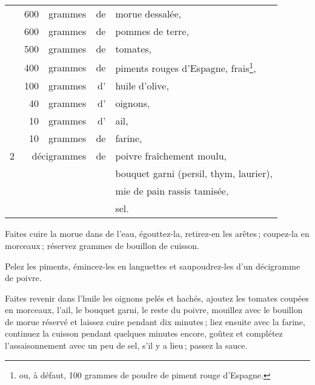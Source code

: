 \footnotesize
\begin{longtable}{rrrrp{16em}}
  & 600 & grammes & de & morue dessalée,                                                                  \\
  & 600 & grammes & de & pommes de terre,                                                                 \\
  & 500 & grammes & de & tomates,                                                                         \\
  & 400 & grammes & de & piments rouges d'Espagne, frais\footnote{ ou, à défaut,
                                100 grammes de poudre de piment rouge d'Espagne.},                        \\
  & 100 & grammes & d' & huile d'olive,                                                                   \\
  &  40 & grammes & d' & oignons,                                                                         \\
  &  10 & grammes & d' & ail,                                                                             \\
  &  10 & grammes & de & farine,                                                                          \\
2 & \multicolumn{2}{r}{décigrammes} & de & poivre fraîchement moulu,                                      \\
  &     &         &    & bouquet garni (persil, thym, laurier),                                           \\
  &     &         &    & mie de pain rassis tamisée,                                                      \\
  &     &         &    & sel.                                                                             \\
\end{longtable}
\normalsize

Faites cuire la morue dans de l’eau, égouttez-la, retirez-en les arêtes ;
coupez-la en morceaux ; réservez {\mmm} grammes de bouillon de cuisson.

Pelez les piments, émincez-les en languettes et saupoudrez-les d'un décigramme
de poivre.

Faites revenir dans l'huile les oignons pelés et hachés, ajoutez les tomates
coupées en morceaux, l'ail, le bouquet garni, le reste du poivre, mouillez avec
le bouillon de morue réservé et laissez cuire pendant dix minutes ; liez
ensuite avec la farine, continuez la cuisson pendant quelques minutes encore,
goûtez et complétez l'assaisonnement avec un peu de sel, s'il y a lieu ; passez
la sauce.

